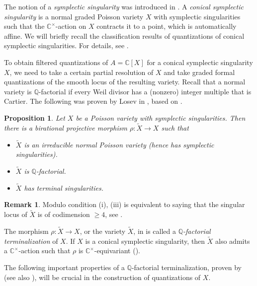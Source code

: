 \documentclass[11pt, a4paper]{amsart}
\newcommand{\C}{\mathbb{C}}
\newcommand{\bQ}{\mathbb{Q}}
\newcommand{\cm}{\C^\times}
\newtheorem{Prop}[Thm]{Proposition}
\theoremstyle{definition}
\newtheorem{Rem}[Thm]{Remark}
\numberwithin{equation}{section}
\begin{document}
The notion of a \emph{symplectic singularity} was introduced in \cite{Beauville1}. A \emph{conical symplectic singularity} is a normal graded Poisson variety $X$ with symplectic singularities such that the $\cm$-action on $X$ contracts it to a point, which is automatically affine.
We will briefly recall the classification results of quantizations of conical symplectic singularities. For details, see \cite{Losev:quan_symp_orbit, LMBM}.

To obtain filtered quantizations of $A=\C[X]$ for a conical symplectic singularity $X$, we need to take a certain partial resolution of $X$ and take graded formal quantizations of the smooth locus of the resulting variety. Recall that a normal variety is $\bQ$-factorial if every Weil divisor has a
(nonzero) integer multiple that is Cartier. The following was proven by Losev in \cite{Losev:SRA}, based on \cite{BCHM}.

\begin{Prop} \label{prop:terminalization}
	Let $X$ be a Poisson variety with symplectic singularities. Then there is a birational projective morphism $\rho: \widetilde{X} \to X$ such that 
	\begin{itemize}
		\item[(i)] $\widetilde{X}$ is an irreducible normal Poisson variety (hence has symplectic singularities).
		\item[(ii)] $\widetilde{X}$ is $\bQ$-factorial.
		\item[(iii)] $\widetilde{X}$ has terminal singularities.
	\end{itemize}
\end{Prop}

\begin{Rem}
	Modulo condition (i), (iii) is equivalent to saying that the singular locus of $\widetilde{X}$ is of codimension $\geqslant 4$, see \cite[Main Theorem]{Namikawa1}.
\end{Rem}

The morphism $\rho: \widetilde{X} \to X$, or the variety $\widetilde{X}$, in  is called a {\it $\bQ$-factorial terminalization} of $X$. If $X$ is a conical symplectic singularity, then $\widetilde{X}$ also admits a $\cm$-action such that $\rho$ is $\cm$-equivariant (\cite[A.7]{Namikawa2}).

The following important properties of a $\bQ$-factorial terminalization, proven by \cite[Lemma 12]{Namikawa2} (see also \cite[Proposition 2.5]{Losev:quan_symp_orbit}), will be crucial in the construction of quantizations of $X$.
\end{document}
